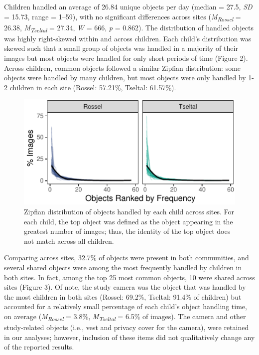 \documentclass[10pt, letterpaper]{article}
\newenvironment{CodeChunk}{}{}
\begin{document}
Children handled an average of 26.84 unique objects per day (median =
27.5, \emph{SD} = 15.73, range = 1--59), with no significant differences
across sites (\emph{M}\textsubscript{\emph{Rossel}} = 26.38,
\emph{M}\textsubscript{\emph{Tseltal}} = 27.34, \emph{W} = 666, \emph{p}
= 0.862). The distribution of handled objects was highly right-skewed
within and across children. Each child's distribution was skewed such
that a small group of objects was handled in a majority of their images
but most objects were handled for only short periods of time (Figure 2).
Across children, common objects followed a similar Zipfian distribution:
some objects were handled by many children, but most objects were only
handled by 1-2 children in each site (Rossel: 57.21\%, Tseltal:
61.57\%).

\begin{CodeChunk}
\begin{figure}[h]

{\centering \includegraphics{figs/zipfian-objects-fig-1} 

}

\caption[Zipfian distribution of objects handled by each child across sites]{Zipfian distribution of objects handled by each child across sites. For each child, the top object was defined as the object appearing in the greatest number of images; thus, the identity of the top object does not match across all children.}\label{fig:zipfian-objects-fig}
\end{figure}
\end{CodeChunk}

Comparing across sites, 32.7\% of objects were present in both
communities, and several shared objects were among the most frequently
handled by children in both sites. In fact, among the top 25 most common
objects, 10 were shared across sites (Figure 3). Of note, the study
camera was the object that was handled by the most children in both
sites (Rossel: 69.2\%, Tseltal: 91.4\% of children) but accounted for a
relatively small percentage of each child's object handling time, on
average (\emph{M}\textsubscript{\emph{Rossel}} = 3.8\%,
\emph{M}\textsubscript{\emph{Tseltal}} = 6.5\% of images). The camera
and other study-related objects (i.e., vest and privacy cover for the
camera), were retained in our analyses; however, inclusion of these
items did not qualitatively change any of the reported results.
\end{document}
